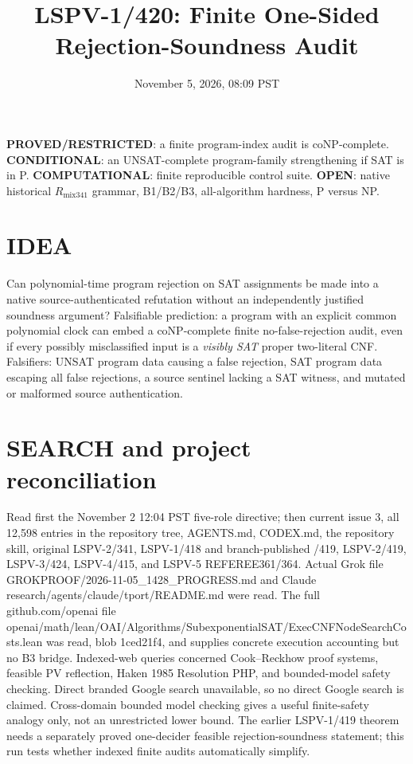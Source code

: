 \documentclass[11pt]{article}
\title{LSPV-1/420: Finite One-Sided Rejection-Soundness Audit}
\date{November 5, 2026, 08:09 PST}
\begin{document}
\maketitle
\noindent\textbf{PROVED/RESTRICTED}: a finite program-index audit is coNP-complete.
\textbf{CONDITIONAL}: an UNSAT-complete program-family strengthening if SAT is in P.
\textbf{COMPUTATIONAL}: finite reproducible control suite.
\textbf{OPEN}: native historical \(R_{\mathrm{mix341}}\) grammar, B1/B2/B3, all-algorithm hardness, P versus NP.

\section*{IDEA}
Can polynomial-time program rejection on SAT assignments be made into a native source-authenticated refutation without an independently justified soundness argument? Falsifiable prediction: a program with an explicit common polynomial clock can embed a coNP-complete finite no-false-rejection audit, even if every possibly misclassified input is a \emph{visibly SAT} proper two-literal CNF. Falsifiers: UNSAT program data causing a false rejection, SAT program data escaping all false rejections, a source sentinel lacking a SAT witness, and mutated or malformed source authentication.

\section*{SEARCH and project reconciliation}
Read first the November 2 12:04 PST five-role directive; then current issue 3, all 12,598 entries in the repository tree, AGENTS.md, CODEX.md, the repository skill, original LSPV-2/341, LSPV-1/418 and branch-published /419, LSPV-2/419, LSPV-3/424, LSPV-4/415, and LSPV-5 REFEREE361/364. Actual Grok file GROKPROOF/2026-11-05\_1428\_PROGRESS.md and Claude research/agents/claude/tport/README.md were read. The full github.com/openai file openai/math/lean/OAI/Algorithms/SubexponentialSAT/ExecCNFNodeSearchCosts.lean was read, blob 1ced21f4, and supplies concrete execution accounting but no B3 bridge. Indexed-web queries concerned Cook--Reckhow proof systems, feasible PV reflection, Haken 1985 Resolution PHP, and bounded-model safety checking. Direct branded Google search unavailable, so no direct Google search is claimed. Cross-domain bounded model checking gives a useful finite-safety analogy only, not an unrestricted lower bound. The earlier LSPV-1/419 theorem needs a separately proved one-decider feasible rejection-soundness statement; this run tests whether indexed finite audits automatically simplify.
\end{document}
